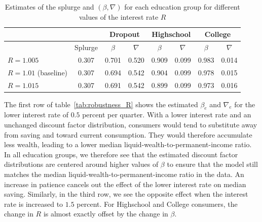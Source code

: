 \documentclass[\econtexRoot/EGMN]{subfiles}
\begin{document}
\begin{table}[t]
    \begin{center}
        \begin{tabular}{lc|cccccc}
            \toprule
                                  &         & \multicolumn{2}{c}{Dropout} & \multicolumn{2}{c}{Highschool} & \multicolumn{2}{c}{College}                                 \\ \midrule
                                  & Splurge & $\beta$                     & $\nabla$                       & $\beta$                     & $\nabla$ & $\beta$ & $\nabla$ \\ \midrule
            $R = 1.005$           & 0.307   & 0.701                       & 0.520                          & 0.909                       & 0.099    & 0.983   & 0.014    \\
            $R = 1.01$ (baseline) & 0.307   & 0.694                       & 0.542                          & 0.904                       & 0.099    & 0.978   & 0.015    \\
            $R = 1.015$           & 0.307   & 0.691                       & 0.542                          & 0.899                       & 0.099    & 0.973   & 0.016
            \\ \bottomrule
        \end{tabular}
        \caption{Estimates of the splurge and $(\beta,\nabla)$ for each education group for different values of the interest rate $R$}
        \notinsubfile{\label{tab:robustness_R}}
    \end{center}
\end{table}

The first row of table~\ref{tab:robustness_R} shows the estimated $\beta_e$ and $\nabla_e$ for the lower interest rate of $0.5$ percent per quarter. With a lower interest rate and an unchanged discount factor distribution, consumers would tend to substitute away from saving and toward current consumption. They would therefore accumulate less wealth, leading to a lower median liquid-wealth-to-permanent-income ratio. In all education groups, we therefore see that the estimated discount factor distributions are centered around higher values of $\beta$ to ensure that the model still matches the median liquid-wealth-to-permanent-income ratio in the data. An increase in patience cancels out the effect of the lower interest rate on median saving. Similarly, in the third row, we see the opposite effect when the interest rate is increased to $1.5$ percent. For Highschool and College consumers, the change in $R$ is almost exactly offset by the change in $\beta$.
\end{document}
